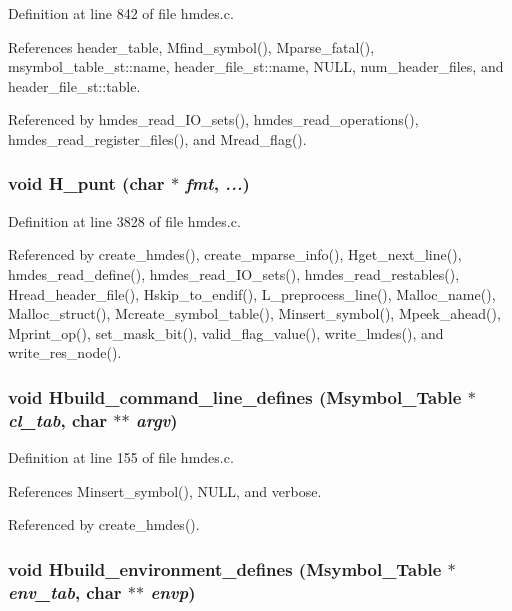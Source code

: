 Definition at line 842 of file hmdes.c.

References header\_\-table, Mfind\_\-symbol(), Mparse\_\-fatal(), msymbol\_\-table\_\-st::name, header\_\-file\_\-st::name, NULL, num\_\-header\_\-files, and header\_\-file\_\-st::table.

Referenced by hmdes\_\-read\_\-IO\_\-sets(), hmdes\_\-read\_\-operations(), hmdes\_\-read\_\-register\_\-files(), and Mread\_\-flag().
\subsubsection{\setlength{\rightskip}{0pt plus 5cm}void H\_\-punt (char $\ast$ {\em fmt},  {\em ...})}\label{hmdes_8h_4b5d684504778c8d474321a099a3c4b2}




Definition at line 3828 of file hmdes.c.

Referenced by create\_\-hmdes(), create\_\-mparse\_\-info(), Hget\_\-next\_\-line(), hmdes\_\-read\_\-define(), hmdes\_\-read\_\-IO\_\-sets(), hmdes\_\-read\_\-restables(), Hread\_\-header\_\-file(), Hskip\_\-to\_\-endif(), L\_\-preprocess\_\-line(), Malloc\_\-name(), Malloc\_\-struct(), Mcreate\_\-symbol\_\-table(), Minsert\_\-symbol(), Mpeek\_\-ahead(), Mprint\_\-op(), set\_\-mask\_\-bit(), valid\_\-flag\_\-value(), write\_\-lmdes(), and write\_\-res\_\-node().
\subsubsection{\setlength{\rightskip}{0pt plus 5cm}void Hbuild\_\-command\_\-line\_\-defines (\bf{Msymbol\_\-Table} $\ast$ {\em cl\_\-tab}, char $\ast$$\ast$ {\em argv})}\label{hmdes_8h_a80c53a0b9e7a49dbeaed5b087e74ff6}




Definition at line 155 of file hmdes.c.

References Minsert\_\-symbol(), NULL, and verbose.

Referenced by create\_\-hmdes().
\subsubsection{\setlength{\rightskip}{0pt plus 5cm}void Hbuild\_\-environment\_\-defines (\bf{Msymbol\_\-Table} $\ast$ {\em env\_\-tab}, char $\ast$$\ast$ {\em envp})}\label{hmdes_8h_ff072a5397cbb97e07781e19a7a213e5}




